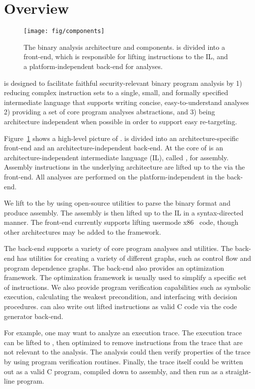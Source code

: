 \section{\bap Overview}

\begin{figure}
\centering
\texttt{[image: fig/components]}
\caption{The \bap binary analysis architecture and components. \bap
  is divided into a front-end, which is responsible for lifting
  instructions to the \bap IL, and a platform-independent back-end
  for analyses.}
\label{fig:vine-components}
\end{figure}

\bap  is designed to facilitate faithful
security-relevant binary program analysis by 1) reducing complex
instruction sets to a single, small, and formally specified
intermediate language that supports writing  concise,
easy-to-understand analyses 2) providing a set of core program analyses
abstractions, and 3) being architecture independent when possible in
order to support easy re-targeting.


Figure~\ref{fig:vine-components} shows a high-level picture of \bap.
\bap is divided into an architecture-specific front-end and an
architecture-independent back-end.  At the core of \bap is an
architecture-independent intermediate language (IL), called \emph{\bil,} for
assembly. Assembly instructions in the underlying architecture are
lifted up to the \bil via the \bap front-end.  All analyses are
performed on the platform-independent \bil in the back-end.

We lift to the \bil by using open-source utilities to parse the binary
format and produce assembly.  The assembly is then lifted up to the
\bap IL in a syntax-directed manner. The \bap front-end currently
supports lifting usermode x86~\cite{intel:x86} code, though other
architectures may be added to the \bap framework.

The \bap back-end supports a variety of core program analyses
and utilities.  The back-end has utilities for creating a variety of
different graphs, such as control flow and program dependence graphs.
The back-end also provides an optimization framework. The optimization
framework is usually used to simplify a specific set of
instructions. We also provide program verification capabilities such
as symbolic execution, calculating the weakest precondition, and
interfacing with decision procedures.  \bap can also write out lifted
\bap instructions as valid C code via the code generator back-end.


For example, one may want to analyze an execution trace. The execution
trace can be lifted to \bap, then optimized to remove
instructions from the trace that are not relevant to the analysis.
The analysis could then verify properties of the trace by using
program verification routines. Finally, the trace itself could be
written out as a valid C program, compiled down to assembly, and then
run as a straight-line program.


